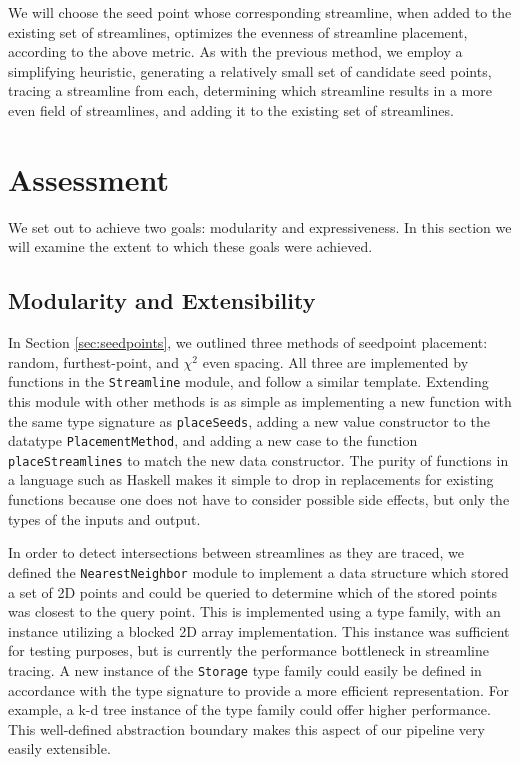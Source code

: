 \documentclass[twocolumn]{article}
\begin{document}
We will choose the seed point whose corresponding streamline, when added to the
existing set of streamlines, optimizes the evenness of streamline placement,
according to the above metric. As with the previous method, we employ a
simplifying heuristic, generating a relatively small set of candidate seed
points, tracing a streamline from each, determining which streamline results in
a more even field of streamlines, and adding it to the existing set of
streamlines.

\section{Assessment}
We set out to achieve two goals: modularity and expressiveness. In this section
we will examine the extent to which these goals were achieved.

\subsection{Modularity and Extensibility}
In Section \ref{sec:seedpoints}, we outlined three methods of seedpoint
placement: random, furthest-point, and $\chi^2$ even spacing. All three
are implemented by functions in the \texttt{Streamline} module, and follow a
similar template. Extending this module with other methods is as simple as
implementing a new function with the same type signature as
\texttt{placeSeeds}, adding a new value constructor to the datatype
\texttt{PlacementMethod}, and adding a new case to the function
\texttt{placeStreamlines} to match the new data constructor. The purity of
functions in a language such as Haskell makes it simple to drop in replacements
for existing functions because one does not have to consider possible side
effects, but only the types of the inputs and output.

In order to detect intersections between streamlines as they are traced, we
defined the \texttt{NearestNeighbor} module to implement a data structure which
stored a set of 2D points and could be queried to determine which of the stored
points was closest to the query point. This is implemented using a type
family, with an instance utilizing a blocked 2D array implementation. This
instance was sufficient for testing purposes, but is currently the performance
bottleneck in streamline tracing. A new instance of the \texttt{Storage}
type family could easily be defined in accordance with the type signature to
provide a more efficient representation. For example, a k-d tree instance of
the type family could offer higher performance. This well-defined abstraction
boundary makes this aspect of our pipeline very easily extensible.
\end{document}
